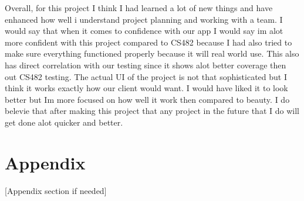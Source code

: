 \documentclass{article}
\begin{document}
Overall, for this project I think I had learned a lot of new things and have enhanced how well i understand project planning and working with a team. I would say that when it comes to confidence with our app I would say im alot more confident with this project compared to CS482 because I had also tried to make sure everything functioned properly because it will real world use. This also has direct correlation with our testing since it shows alot better coverage then out CS482 testing. The actual UI of the project is not that sophisticated but I think it works exactly how our client would want. I would have liked it to look better but Im more focused on how well it work then compared to beauty. I do belevie that after making this project that any project in the future that I do will get done alot quicker and better.




\section*{Appendix}
[Appendix section if needed]
\end{document}
